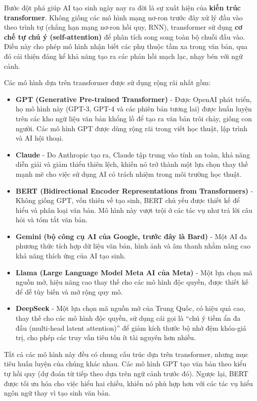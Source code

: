 Bước đột phá giúp AI tạo sinh ngày nay ra đời là sự xuất hiện của \textbf{kiến trúc transformer}. Không giống các mô hình mạng nơ-ron trước đây xử lý đầu vào theo trình tự (chẳng hạn mạng nơ-ron hồi quy, RNN), transformer sử dụng \textbf{cơ chế tự chú ý (self-attention)} để phân tích song song toàn bộ chuỗi đầu vào. Điều này cho phép mô hình nhận biết các phụ thuộc tầm xa trong văn bản, qua đó cải thiện đáng kể khả năng tạo ra các phản hồi mạch lạc, nhạy bén với ngữ cảnh.

Các mô hình dựa trên transformer được sử dụng rộng rãi nhất gồm:

\begin{itemize}
\item
  \textbf{GPT (Generative Pre-trained Transformer)} - Được OpenAI phát triển, họ mô hình này (GPT-3, GPT-4 và các phiên bản tương lai) được huấn luyện trên các kho ngữ liệu văn bản khổng lồ để tạo ra văn bản trôi chảy, giống con người. Các mô hình GPT được dùng rộng rãi trong viết học thuật, lập trình và AI hội thoại.
\item
  \textbf{Claude} - Do Anthropic tạo ra, Claude tập trung vào tính an toàn, khả năng diễn giải và giảm thiểu thiên lệch, khiến nó trở thành một lựa chọn thay thế mạnh mẽ cho việc sử dụng AI có trách nhiệm trong môi trường học thuật.
\item
  \textbf{BERT (Bidirectional Encoder Representations from Transformers)} - Không giống GPT, vốn thiên về tạo sinh, BERT chủ yếu được thiết kế để hiểu và phân loại văn bản. Mô hình này vượt trội ở các tác vụ như trả lời câu hỏi và tóm tắt văn bản.
\item
  \textbf{Gemini (bộ công cụ AI của Google, trước đây là Bard)} - Một AI đa phương thức tích hợp dữ liệu văn bản, hình ảnh và âm thanh nhằm nâng cao khả năng thích ứng của AI tạo sinh.
\item
  \textbf{Llama (Large Language Model Meta AI của Meta)} - Một lựa chọn mã nguồn mở, hiệu năng cao thay thế cho các mô hình độc quyền, được thiết kế để dễ tùy biến và mở rộng quy mô.
\item
  \textbf{DeepSeek} - Một lựa chọn mã nguồn mở của Trung Quốc, có hiệu quả cao, thay thế cho các mô hình độc quyền, sử dụng cái gọi là ``chú ý tiềm ẩn đa đầu (multi-head latent attention)'' để giảm kích thước bộ nhớ đệm khóa-giá trị, cho phép các truy vấn tiêu tốn ít tài nguyên hơn nhiều.
\end{itemize}

Tất cả các mô hình này đều có chung cấu trúc dựa trên transformer, nhưng mục tiêu huấn luyện của chúng khác nhau. Các mô hình GPT tạo văn bản theo kiểu tự hồi quy (dự đoán từ tiếp theo dựa trên ngữ cảnh trước đó). Ngược lại, BERT được tối ưu hóa cho việc hiểu hai chiều, khiến nó phù hợp hơn với các tác vụ hiểu ngôn ngữ thay vì tạo sinh văn bản.

